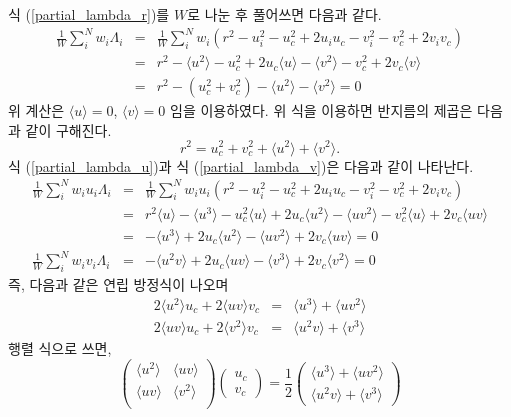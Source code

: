 \documentclass[chapter,a4paper,10pt]{oblivoir}
\begin{document}
식 (\ref{partial_lambda_r})를 $W$로 나눈 후 풀어쓰면 다음과 같다.
\begin{eqnarray}
\frac{1}{W}\sum_i^Nw_i\Lambda_i &=& \frac{1}{W}\sum_i^Nw_i \left(r^2 - u_i^2 - u_c^2 + 2u_iu_c - v_i^2 - v_c^2 + 2v_iv_c\right) \\
&=& r^2 - \langle u^2\rangle - u_c^2 + 2u_c\langle u \rangle - \langle v^2 \rangle - v_c^2 + 2v_c\langle v\rangle\nonumber\\
&=& r^2 - (u_c^2+v_c^2) - \langle u^2\rangle - \langle v^2 \rangle = 0 \nonumber
\end{eqnarray}
위 계산은 $\langle u \rangle = 0$, $\langle v \rangle = 0$ 임을 이용하였다. 위 식을 이용하면 반지름의 제곱은 다음과 같이 구해진다.
\begin{equation}
r^2 = u_c^2+v_c^2 + \langle u^2\rangle + \langle v^2\rangle.
\end{equation}
식 (\ref{partial_lambda_u})과 식 (\ref{partial_lambda_v})은 다음과 같이 나타난다.
\begin{eqnarray}
\frac{1}{W}\sum_i^Nw_iu_i\Lambda_i &=& \frac{1}{W}\sum_i^Nw_iu_i \left(r^2 - u_i^2 - u_c^2 + 2u_iu_c - v_i^2 - v_c^2 + 2v_iv_c\right)  \\
&=& r^2\langle u \rangle - \langle u^3\rangle - u_c^2\langle u \rangle + 2u_c\langle u^2 \rangle - \langle uv^2 \rangle - v_c^2\langle u \rangle + 2v_c\langle uv\rangle \nonumber\\
&=& - \langle u^3\rangle + 2u_c\langle u^2 \rangle - \langle uv^2 \rangle + 2v_c\langle uv\rangle = 0\nonumber\\
\frac{1}{W}\sum_i^Nw_iv_i\Lambda_i &=& - \langle u^2v\rangle + 2u_c\langle uv \rangle - \langle v^3 \rangle + 2v_c\langle v^2\rangle = 0
\end{eqnarray}
즉, 다음과 같은 연립 방정식이 나오며
\begin{eqnarray}
2\langle u^2 \rangle u_c + 2\langle uv  \rangle v_c &=& \langle u^3\rangle + \langle uv^2 \rangle \\
2\langle uv  \rangle u_c + 2\langle v^2 \rangle v_c &=& \langle u^2v\rangle + \langle v^3 \rangle
\end{eqnarray}
행렬 식으로 쓰면,
\begin{equation}
\left( \begin{array}{cc}
  \langle u^2 \rangle & \langle uv  \rangle \\
  \langle uv  \rangle & \langle v^2 \rangle \\
\end{array} \right)
\left( \begin{array}{ll}
  u_c \\
  v_c
\end{array} \right)
= \frac{1}{2}
\left( \begin{array}{ll}
  \langle u^3\rangle + \langle uv^2 \rangle \\
  \langle u^2v\rangle + \langle v^3 \rangle 
\end{array} \right)
\end{equation}
\end{document}
